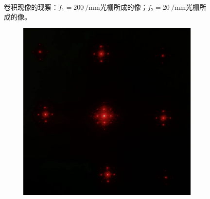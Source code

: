 \documentclass[a4paper]{article}
\begin{document}
\begin{figure}[H]
\begin{subfigure}[t]{0.35\textwidth}
        \caption{}
        \label{fig8-2}
    \end{subfigure}
    \captionsetup{justification=centering,subrefformat=parens,margin=2cm}
    \caption{卷积现像的现察：$f_1=\SI{200}{\per\mm}$光栅所成的像；$f_2=\SI{20}{\per\mm}$光栅所成的像。}
\end{figure}

\begin{figure}[H]\ContinuedFloat
    \centering
    \begin{subfigure}[t]{0.3\textwidth}
        \centering
        \includegraphics[width=\textwidth]{phone-img/7.jpg}
        \caption{}
        \label{fig8-3}
    \end{subfigure}
    \begin{subfigure}[t]{0.3\textwidth}
        \centering

\end{subfigure}
\end{figure}
\end{document}
